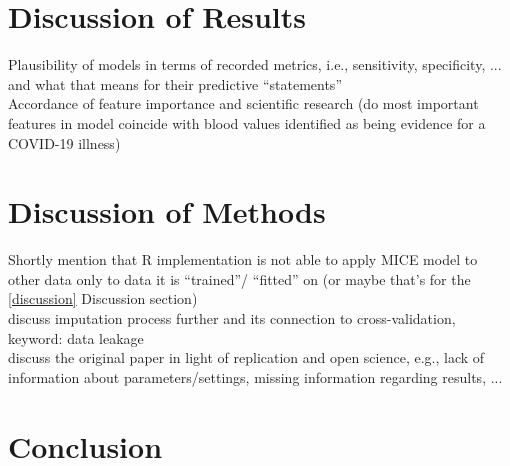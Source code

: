 \section{Discussion of Results}
\begin{changemargin}{50pt}{50pt}
 Plausibility of models in terms of recorded metrics, i.e., sensitivity, 
specificity, ... and what that means for their predictive ``statements''
\\
Accordance of feature importance and scientific research (do most important 
features in model coincide with blood values identified as being evidence for a 
COVID-19 illness)
\end{changemargin}
\section{Discussion of Methods}
\begin{changemargin}{50pt}{50pt}
Shortly mention that R implementation is not able to apply MICE model to other 
data only to data it is ``trained''/ ``fitted'' on (or maybe that's for the 
\ref{discussion} Discussion section)
\\
discuss imputation process further and its connection to cross-validation, 
keyword: data leakage
\\
discuss the original paper in light of replication and open science, e.g., lack 
of information about parameters/settings, missing information regarding 
results, ...
\end{changemargin}
\section{Conclusion}
